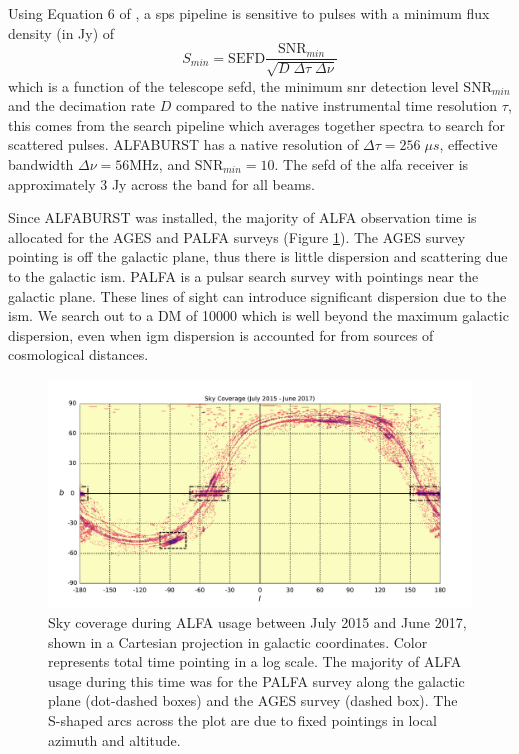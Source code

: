 \documentclass[a4paper,fleqn,usenatbib]{mnras}
\begin{document}


Using Equation 6 of \cite{2015MNRAS.452.1254K}, a \gls*{sps} pipeline is
sensitive to pulses with a minimum flux density (in Jy) of
%
\begin{equation}
S_{min} = \textrm{SEFD} \frac{\textrm{SNR}_{min}}{\sqrt{D \; \Delta \tau \;
\Delta \nu}}
\end{equation}
%
which is a function of the telescope \gls*{sefd}, the minimum \gls*{snr}
detection level $\textrm{SNR}_{min}$ and the decimation rate $D$ compared to the
native instrumental time resolution $\tau$, this comes from the search pipeline
which averages together spectra to search for scattered pulses. ALFABURST has a
native resolution of $\Delta \tau = 256 \; \mu s$, effective bandwidth $\Delta
\nu = 56 \textrm{MHz}$, and $\textrm{SNR}_{min} = 10$. The \gls*{sefd} of the
\gls*{alfa} receiver is approximately 3 Jy across the band for all beams.



Since ALFABURST was installed, the majority of ALFA observation time is
allocated for the AGES \citep{2006MNRAS.371.1617A} and PALFA
\citep{2006ApJ...637..446C} surveys (Figure \ref{fig:sky_coverage}).  The AGES
survey pointing is off the galactic plane, thus there is little dispersion and
scattering due to the galactic \gls*{ism}. PALFA is a pulsar search survey with
pointings near the galactic plane. These lines of sight can introduce
significant dispersion due to the \gls*{ism}. We search out to a DM of 10000
which is well beyond the maximum galactic dispersion, even when \gls*{igm}
dispersion is accounted for from sources of cosmological distances.

\begin{figure}
    \includegraphics[width=1.0\linewidth]{figures/cartview_sky_coverage.pdf}
    \caption{Sky coverage during ALFA usage between July 2015 and June 2017,
    shown in a Cartesian projection in galactic coordinates. Color represents
    total time pointing in a log scale. The majority of ALFA usage during this
    time was for the PALFA survey along the galactic plane (dot-dashed boxes)
    and the AGES survey (dashed box).  The S-shaped arcs across the plot are due
    to fixed pointings in local azimuth and altitude.
    }
    \label{fig:sky_coverage}
\end{figure}
\end{document}
